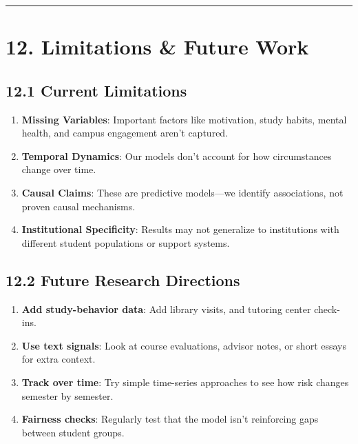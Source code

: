 \documentclass[
]{article}
\providecommand{\tightlist}{%
  \setlength{\itemsep}{0pt}\setlength{\parskip}{0pt}}
\begin{document}
\begin{center}\rule{0.5\linewidth}{0.5pt}\end{center}

\section{12. Limitations \& Future Work}\label{limitations-future-work}

\subsection{12.1 Current Limitations}\label{current-limitations}

\begin{enumerate}
\def\labelenumi{\arabic{enumi}.}
\tightlist
\item
  \textbf{Missing Variables}: Important factors like motivation, study
  habits, mental health, and campus engagement aren't captured.
\item
  \textbf{Temporal Dynamics}: Our models don't account for how
  circumstances change over time.
\item
  \textbf{Causal Claims}: These are predictive models---we identify
  associations, not proven causal mechanisms.
\item
  \textbf{Institutional Specificity}: Results may not generalize to
  institutions with different student populations or support systems.
\end{enumerate}

\subsection{12.2 Future Research
Directions}\label{future-research-directions}

\begin{enumerate}
\def\labelenumi{\arabic{enumi}.}
\tightlist
\item
  \textbf{Add study-behavior data}: Add library visits, and tutoring
  center check-ins.
\item
  \textbf{Use text signals}: Look at course evaluations, advisor notes,
  or short essays for extra context.
\item
  \textbf{Track over time}: Try simple time-series approaches to see how
  risk changes semester by semester.
\item
  \textbf{Fairness checks}: Regularly test that the model isn't
  reinforcing gaps between student groups.
\end{enumerate}
\end{document}
